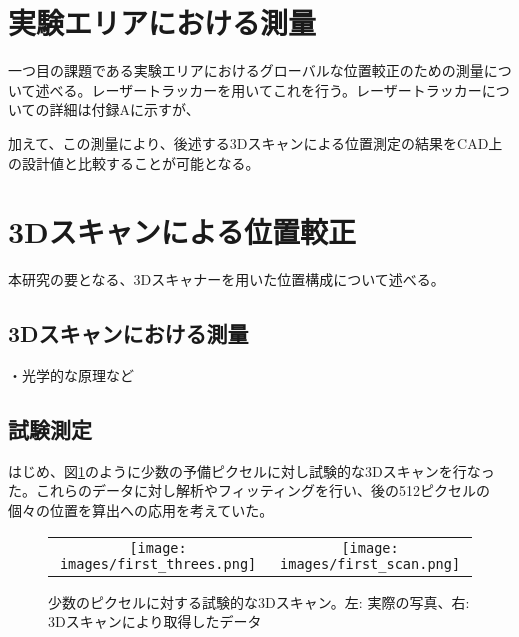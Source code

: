 \documentclass[Yonemoto_master.tex]{subfiles}
\begin{document}
\section{実験エリアにおける測量}
一つ目の課題である実験エリアにおけるグローバルな位置較正のための測量について述べる。レーザートラッカーを用いてこれを行う。レーザートラッカーについての詳細は付録Aに示すが、


加えて、この測量により、後述する3Dスキャンによる位置測定の結果をCAD上の設計値と比較することが可能となる。


\section{3Dスキャンによる位置較正}
本研究の要となる、3Dスキャナーを用いた位置構成について述べる。

\subsection{3Dスキャンにおける測量}
・光学的な原理など

\subsection{試験測定}

はじめ、図\ref{fig: first_scan}のように少数の予備ピクセルに対し試験的な3Dスキャンを行なった。これらのデータに対し解析やフィッティングを行い、後の512ピクセルの個々の位置を算出への応用を考えていた。

\begin{figure}[h]
    \begin{tabular}{cc}
      \begin{minipage}[t]{0.45\hsize}
        \centering
        \texttt{[image: images/first\_threes.png]}
      \end{minipage} &
      \begin{minipage}[t]{0.45\hsize}
        \centering
        \texttt{[image: images/first\_scan.png]}
      \end{minipage}
    \end{tabular}
    \caption{少数のピクセルに対する試験的な3Dスキャン。左: 実際の写真、右: 3Dスキャンにより取得したデータ}
    \label{fig: first_scan}
  \end{figure}
  
\end{document}
